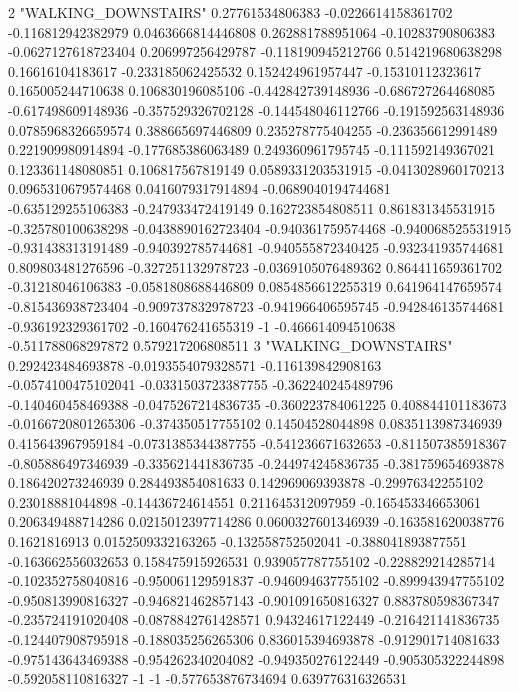 2 "WALKING_DOWNSTAIRS" 0.27761534806383 -0.0226614158361702 -0.116812942382979 0.0463666814446808 0.262881788951064 -0.10283790806383 -0.0627127618723404 0.206997256429787 -0.118190945212766 0.514219680638298 0.16616104183617 -0.233185062425532 0.152424961957447 -0.15310112323617 0.165005244710638 0.106830196085106 -0.442842739148936 -0.686727264468085 -0.617498609148936 -0.357529326702128 -0.144548046112766 -0.191592563148936 0.0785968326659574 0.388665697446809 0.235278775404255 -0.236356612991489 0.221909980914894 -0.177685386063489 0.249360961795745 -0.111592149367021 0.123361148080851 0.106817567819149 0.0589331203531915 -0.0413028960170213 0.0965310679574468 0.0416079317914894 -0.0689040194744681 -0.635129255106383 -0.247933472419149 0.162723854808511 0.861831345531915 -0.325780100638298 -0.0438890162723404 -0.940361759574468 -0.940068525531915 -0.931438313191489 -0.940392785744681 -0.940555872340425 -0.932341935744681 0.809803481276596 -0.327251132978723 -0.0369105076489362 0.864411659361702 -0.31218046106383 -0.0581808688446809 0.0854856612255319 0.641964147659574 -0.815436938723404 -0.909737832978723 -0.941966406595745 -0.942846135744681 -0.936192329361702 -0.160476241655319 -1 -0.466614094510638 -0.511788068297872 0.579217206808511
3 "WALKING_DOWNSTAIRS" 0.292423484693878 -0.0193554079328571 -0.116139842908163 -0.0574100475102041 -0.0331503723387755 -0.362240245489796 -0.140460458469388 -0.0475267214836735 -0.360223784061225 0.408844101183673 -0.0166720801265306 -0.374350517755102 0.14504528044898 0.0835113987346939 0.415643967959184 -0.0731385344387755 -0.541236671632653 -0.811507385918367 -0.805886497346939 -0.335621441836735 -0.244974245836735 -0.381759654693878 0.186420273246939 0.284493854081633 0.142969069393878 -0.29976342255102 0.23018881044898 -0.14436724614551 0.211645312097959 -0.165453346653061 0.206349488714286 0.0215012397714286 0.0600327601346939 -0.163581620038776 0.1621816913 0.0152509332163265 -0.132558752502041 -0.388041893877551 -0.163662556032653 0.158475915926531 0.939057787755102 -0.228829214285714 -0.102352758040816 -0.950061129591837 -0.946094637755102 -0.899943947755102 -0.950813990816327 -0.946821462857143 -0.901091650816327 0.883780598367347 -0.235724191020408 -0.0878842761428571 0.94324617122449 -0.216421141836735 -0.124407908795918 -0.188035256265306 0.836015394693878 -0.912901714081633 -0.975143643469388 -0.954262340204082 -0.949350276122449 -0.905305322244898 -0.592058110816327 -1 -1 -0.577653876734694 0.639776316326531
